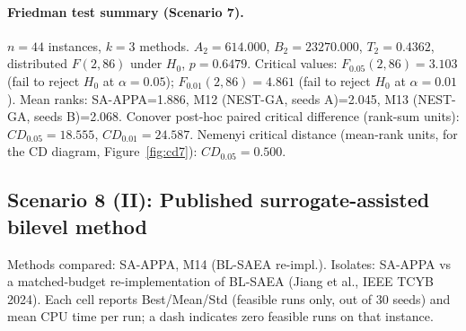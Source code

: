 \paragraph{Friedman test summary (Scenario 7).}
$n=44$ instances, $k=3$ methods. $A_2=614.000$, $B_2=23270.000$, $T_2=0.4362$, distributed $F(2,86)$ under $H_0$, $p=0.6479$. Critical values: $F_{0.05}(2,86)=3.103$ (fail to reject $H_0$ at $\alpha=0.05$); $F_{0.01}(2,86)=4.861$ (fail to reject $H_0$ at $\alpha=0.01$). Mean ranks: SA-APPA=1.886, M12 (NEST-GA, seeds A)=2.045, M13 (NEST-GA, seeds B)=2.068. Conover post-hoc paired critical difference (rank-sum units): $CD_{0.05}=18.555$, $CD_{0.01}=24.587$. Nemenyi critical distance (mean-rank units, for the CD diagram, Figure~\ref{fig:cd7}): $CD_{0.05}=0.500$.

\subsection{Scenario 8 (II): Published surrogate-assisted bilevel method}
\label{app:scenario8}
Methods compared: SA-APPA, M14 (BL-SAEA re-impl.). Isolates: SA-APPA vs a matched-budget re-implementation of BL-SAEA (Jiang et al., IEEE TCYB 2024). Each cell reports Best/Mean/Std (feasible runs only, out of 30 seeds) and mean CPU time per run; a dash indicates zero feasible runs on that instance.

